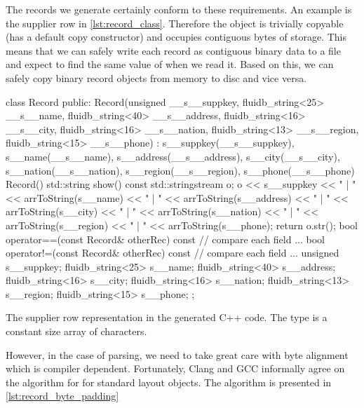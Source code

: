 The records we generate certainly conform to these requirements. An
example is the supplier row in \ref{lst:record_class}. Therefore the
object is trivially copyable (has a default copy constructor) and
occupies contiguous bytes of storage. This means that we can safely
write each record  as  contiguous binary data to
a file and expect to find the same value of  when we read
it. Based on this, we can safely copy binary record objects from
memory to disc and vice versa.

\begin{code}
\begin{cppcode}
class Record {
public:
  Record(unsigned __s__suppkey, fluidb_string<25> __s__name,
         fluidb_string<40> __s__address, fluidb_string<16> __s__city,
         fluidb_string<16> __s__nation, fluidb_string<13> __s__region,
         fluidb_string<15> __s__phone)
    : s__suppkey(__s__suppkey),
      s__name(__s__name),
      s__address(__s__address),
      s__city(__s__city),
      s__nation(__s__nation),
      s__region(__s__region),
      s__phone(__s__phone) {}
  Record() {}
  std::string show() const {
    std::stringstream o;
    o << s__suppkey << " | " << arrToString(s__name) << " | "
      << arrToString(s__address) << " | " << arrToString(s__city) << " | "
      << arrToString(s__nation) << " | " << arrToString(s__region) << " | "
      << arrToString(s__phone);
    return o.str();
  }
  bool operator==(const Record& otherRec) const {
    // compare each field ...
  }
  bool operator!=(const Record& otherRec) const {
    // compare each field ...
  }
  unsigned s__suppkey;
  fluidb_string<25> s__name;
  fluidb_string<40> s__address;
  fluidb_string<16> s__city;
  fluidb_string<16> s__nation;
  fluidb_string<13> s__region;
  fluidb_string<15> s__phone;
};
\end{cppcode}
  \caption{\label{lst:record_class}The supplier row representation in
    the generated C++ code. The  type is a
    constant size array of characters.}
\end{code}

However, in the case of parsing, we need to take great care with byte
alignment which is compiler dependent. Fortunately, Clang and GCC
informally agree on the algorithm for  for
standard layout objects. The algorithm is presented in
\ref{lst:record_byte_padding}

